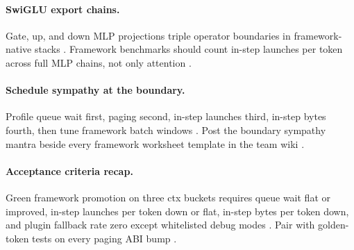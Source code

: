 \paragraph{SwiGLU export chains.} Gate, up, and down MLP projections triple operator boundaries in framework-native stacks \citep{taxbreak2026,memoryfloor2026,patel2025llminference,yirage2026,chen2020compilerbasedhardw,dao2022flashattention,liu2024deepseekv3,kwon2023vllm,nvidia2024cudagraphs,amd2024aie,amd2024xdna,dlbook,dao2023flashdecoding,nvidia2022hopper,semianalysis2024tma}. Framework benchmarks should count in-step launches per token across full MLP chains, not only attention \citep{memoryfloor2026,yirage2026,chen2020compilerbasedhardw,patel2025llminference,taxbreak2026,kwon2023vllm,dlbook}.

\paragraph{Schedule sympathy at the boundary.} Profile queue wait first, paging second, in-step launches third, in-step bytes fourth, then tune framework batch windows \citep{patel2025llminference,kwon2023vllm,taxbreak2026,memoryfloor2026,yirage2026,chen2020compilerbasedhardw,liu2024deepseekv3,nvidia2024cudagraphs,dao2022flashattention,amd2024aie,amd2024xdna,dlbook,dao2023flashdecoding,nvidia2022hopper,semianalysis2024tma}. Post the boundary sympathy mantra beside every framework worksheet template in the team wiki \citep{yirage2026,chen2020compilerbasedhardw,patel2025llminference,kwon2023vllm,memoryfloor2026,taxbreak2026,dlbook}.


\paragraph{Acceptance criteria recap.} Green framework promotion on three ctx buckets requires queue wait flat or improved, in-step launches per token down or flat, in-step bytes per token down, and plugin fallback rate zero except whitelisted debug modes \citep{kwon2023vllm,patel2025llminference,taxbreak2026,memoryfloor2026,yirage2026,chen2020compilerbasedhardw,liu2024deepseekv3,nvidia2024cudagraphs,dao2022flashattention,amd2024aie,amd2024xdna,dlbook,dao2023flashdecoding,nvidia2022hopper,semianalysis2024tma}. Pair with golden-token tests on every paging ABI bump \citep{yirage2026,chen2020compilerbasedhardw,kwon2023vllm,patel2025llminference,memoryfloor2026,taxbreak2026,dlbook}.

